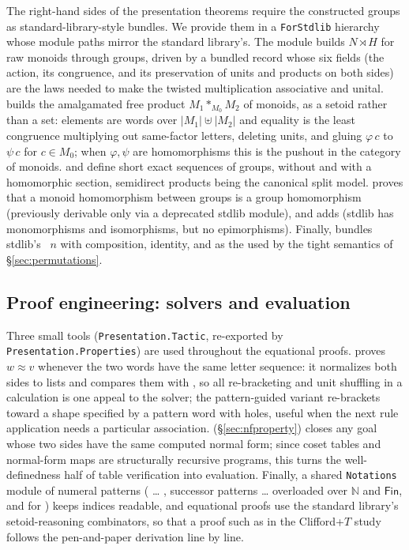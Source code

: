 The right-hand sides of the presentation theorems require the constructed
groups as standard-library-style bundles.  We provide them
in a \texttt{ForStdlib} hierarchy whose module paths mirror the standard
library's.
The module  builds $N \rtimes H$
for raw monoids through groups, driven by a bundled  record
whose six fields (the action, its congruence, and its preservation of
units and products on both sides) are the laws needed to make the
twisted multiplication associative and unital.
 builds the amalgamated free product
$M_1 \ast_{M_0} M_2$ of monoids, as a setoid rather than a set:
elements are words over $|M_1| \uplus |M_2|$ and equality is the least
congruence multiplying out same-factor letters, deleting units, and gluing
$\varphi\,c$ to $\psi\,c$ for $c \in M_0$; when $\varphi, \psi$ are
homomorphisms this is the pushout in the category of monoids.
and  define short exact sequences of groups, without
and with a homomorphic section, semidirect products being the canonical
split model.   proves that a monoid
homomorphism between groups is a group homomorphism (previously derivable
only via a deprecated stdlib module), and
 adds  (stdlib
has monomorphisms and isomorphisms, but no epimorphisms).  Finally,
 bundles stdlib's
~$n$ with composition, identity, and  as the
 used by the tight semantics of \S\ref{sec:permutations}.

\subsection{Proof engineering: solvers and evaluation}\label{sec:solvers}

Three small tools (\texttt{Presentation.Tactic}, re-exported by
\texttt{Presentation.Properties}) are used throughout the equational
proofs.
 proves $w \approx v$ whenever the two words have the same
letter sequence: it normalizes both sides to lists and compares them
with , so all re-bracketing and unit shuffling in a
calculation is one appeal to the solver; the pattern-guided variant
 re-brackets toward a shape specified by a pattern word
with holes, useful when the next rule application needs a
particular association.   (\S\ref{sec:nfproperty})
closes any goal whose two sides have the same computed normal form; since
coset tables and normal-form maps are structurally recursive programs,
this turns the well-definedness half of table verification into
evaluation.  Finally, a shared \texttt{Notations}
module of numeral patterns
( … , successor patterns  …  overloaded
over $\mathbb{N}$ and $\mathsf{Fin}$, and  for )
keeps indices readable, and equational proofs use the standard
library's setoid-reasoning combinators, so that a proof such as
 in the Clifford+$T$ study follows the pen-and-paper
derivation line by line.
